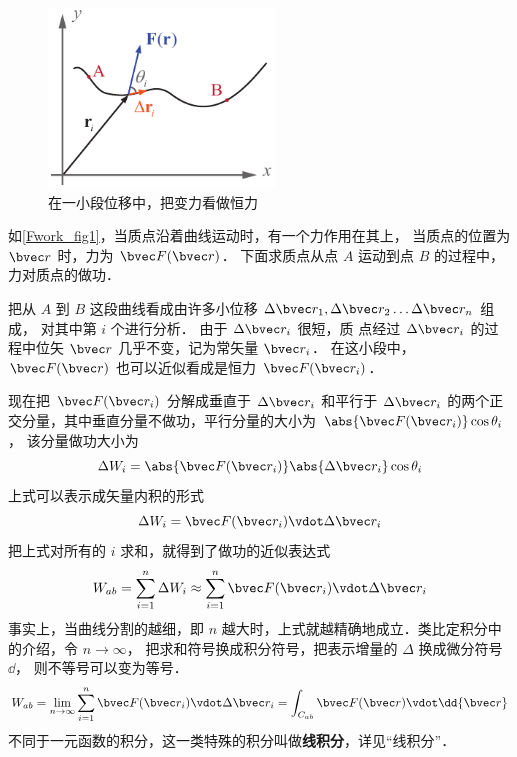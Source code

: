 

\begin{figure}[ht]
\centering
\includegraphics[width=6cm]{./figures/Fwork1.pdf}
\caption{在一小段位移中，把变力看做恒力}\label{Fwork_fig1}
\end{figure}

如\autoref{Fwork_fig1}，当质点沿着曲线运动时，有一个力作用在其上， 当质点的位置为 $\bvec r$ 时，力为 $\bvec F(\bvec r)$． 下面求质点从点 $A$ 运动到点 $B$ 的过程中，力对质点的做功．

把从 $A$ 到 $B$ 这段曲线看成由许多小位移 $\Delta \bvec r_1, \Delta \bvec r_2 \dots \Delta \bvec r_n$ 组成， 对其中第 $i$ 个进行分析． 由于 $\Delta \bvec r_i$ 很短，质
点经过 $\Delta \bvec r_i$ 的过程中位矢 $\bvec r$ 几乎不变，记为常矢量 $\bvec r_i$． 在这小段中，  $\bvec F(\bvec r)$ 也可以近似看成是恒力 $\bvec F(\bvec r_i)$． 

现在把 $\bvec F(\bvec r_i)$ 分解成垂直于 $\Delta \bvec r_i$ 和平行于 $\Delta \bvec r_i$ 的两个正交分量，其中垂直分量不做功，平行分量的大小为 $ \abs{\bvec F(\bvec r_i)} \cos \theta_i$， 该分量做功大小为
\begin{equation}
\Delta W_i = \abs{\bvec F(\bvec r_i)} \abs{\Delta \bvec r_i} \cos \theta_i
\end{equation}
上式可以表示成矢量内积的形式
\begin{equation}\label{Fwork_eq2}
\Delta W_i = \bvec F(\bvec r_i) \vdot \Delta \bvec r_i
\end{equation}
把上式对所有的 $i$ 求和，就得到了做功的近似表达式
\begin{equation}
W_{ab} = \sum_{i = 1}^n \Delta W_i  \approx \sum_{i = 1}^n \bvec F(\bvec r_i) \vdot \Delta \bvec r_i 
\end{equation} 
事实上，当曲线分割的越细，即 $n$ 越大时，上式就越精确地成立．类比定积分中的介绍，令 $n \to \infty $， 把求和符号换成积分符号，把表示增量的 $\Delta $ 换成微分符号 $\dd{}$， 则不等号可以变为等号．
\begin{equation}
W_{ab} = \lim_{n \to \infty } \sum_{i = 1}^n \bvec F(\bvec r_i) \vdot \Delta \bvec r_i  = \int_{C_{ab}} \bvec F(\bvec r) \vdot \dd{\bvec r}
\end{equation} 
不同于一元函数的积分，这一类特殊的积分叫做\textbf{线积分}，详见“线积分”．

